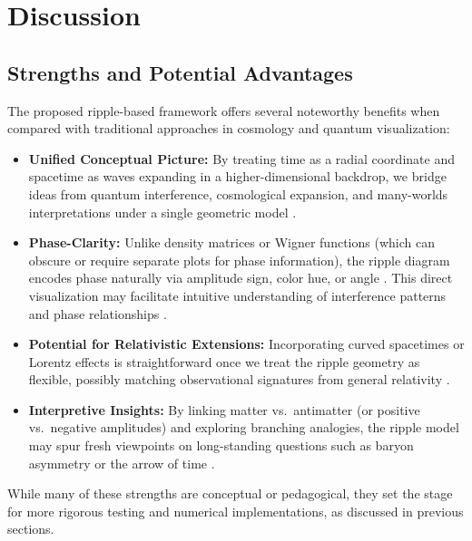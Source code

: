 \documentclass{article}
\begin{document}
\section{Discussion}
\label{sec:discussion}

\subsection{Strengths and Potential Advantages}
\label{subsec:strengths-advantages}
The proposed ripple-based framework offers several noteworthy benefits when 
compared with traditional approaches in cosmology and quantum visualization:
\begin{itemize}
  \item \textbf{Unified Conceptual Picture:} 
    By treating time as a radial coordinate and spacetime as waves expanding 
    in a higher-dimensional backdrop, we bridge ideas from quantum interference, 
    cosmological expansion, and many-worlds interpretations under a single 
    geometric model \cite{penrose2004, susskind2008}.
  \item \textbf{Phase-Clarity:} 
    Unlike density matrices or Wigner functions (which can obscure or require 
    separate plots for phase information), the ripple diagram encodes phase 
    naturally via amplitude sign, color hue, or angle \cite{wigner1932, schleich2001quantum}. 
    This direct visualization may facilitate intuitive understanding of interference 
    patterns and phase relationships \cite{feynmanlectures}.
  \item \textbf{Potential for Relativistic Extensions:} 
    Incorporating curved spacetimes or Lorentz effects is straightforward 
    once we treat the ripple geometry as flexible, possibly matching 
    observational signatures from general relativity \cite{rindler1977essential, misner1973}.
  \item \textbf{Interpretive Insights:} 
    By linking matter vs.\ antimatter (or positive vs.\ negative amplitudes) 
    and exploring branching analogies, the ripple model may spur fresh viewpoints 
    on long-standing questions such as baryon asymmetry or the arrow of time 
    \cite{Sakharov1967, Penrose1979, everett1957}.
\end{itemize}
While many of these strengths are conceptual or pedagogical, they set the stage 
for more rigorous testing and numerical implementations, as discussed in previous 
sections.
\end{document}
